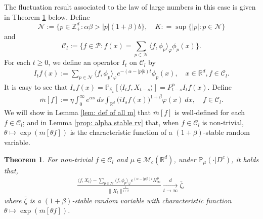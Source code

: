 \documentclass[12pt,a4paper]{amsart}
\theoremstyle{plain}
\newtheorem{thm}{Theorem}[section]
\theoremstyle{definition}
\numberwithin{equation}{section}
\begin{document}
   The fluctuation result associated to the law of large numbers in this case is
    given in Theorem \ref{thm: large clt} below.
Define
\begin{equation}
\label{eq: def of N}
    \mathcal{N}:=\{p\in \mathbb{Z}_+^d:  \alpha\beta>|p|(1+\beta)b\},
    \quad K : = \sup\{|p|: p \in \mathcal N\}
\end{equation}
    and
\begin{equation}
\label{eq: def of Cl}
    \mathcal{C}_l:=\Big\{f\in \mathcal P: f(x)=\sum_{p\in\mathcal{N}}\langle f, \phi_p\rangle_{\varphi}\phi_p(x)\Big\}.
\end{equation}
    For each $t\ge 0$, we define an operator $I_t$ on $\mathcal{C}_l$ by
\begin{align}\label{definition of Itf}
    I_tf(x)
    :=\sum_{p\in \mathcal{N}}\langle f, \phi_p\rangle_{\varphi} e^{-(\alpha-|p|b)t}\phi_p(x),
   \quad x\in \mathbb{R}^d, f\in \mathcal C_l.
\end{align}
    It is easy to see that $I_sf(x)=\mathbb{P}_{\delta_x}[\langle I_t f, X_{t-s}\rangle]=P_{t-s}^{\alpha}I_tf(x)$.
    Define
\begin{align}\label{bar-m}
   \bar{m}[f]
   :=\eta \int_{0}^{\infty} e^{\alpha s}~ds \int_{\mathbb R^d} \big(iI_sf(x)\big)^{1+\beta}\varphi(x)~dx,
   \quad f\in \mathcal C_l.
\end{align}
    We will show in Lemma \ref{lem: def of all m} that $\bar{m}[f]$ is well-defined for each $f\in \mathcal C_l$; and in Lemma \ref{prop: alpha stable rv} that, 
    when $f\in \mathcal C_l$ is non-trivial,
    $\theta \mapsto \exp( \bar m[\theta f])$ is the characteristic
    function of a $(1+\beta)$-stable random variable.
\begin{thm}
\label{thm: large clt}
    For non-trivial $f\in\mathcal{C}_l$ and $\mu\in \mathcal{M}_c(\mathbb{R}^d)$, under $\mathbb{P}_{\mu}(\cdot|D^c)$, it holds that,
\begin{align}\label{thm: large rate}
    \frac{\langle f, X_t\rangle-\sum_{p\in\mathcal{N}}\langle f,\phi_p\rangle_\varphi e^{(\alpha-|p|b)t}H^p_{\infty}}{\|X_t\|^\frac{1}{1+\beta}}\xrightarrow[t\to \infty]{d}\bar{\zeta},
\end{align}
    where $\bar{\zeta}$ is a $(1+\beta)$-stable random variable with characteristic function
$\theta\mapsto \exp(\bar{m}[\theta f])$.
\end{thm}
\end{document}
